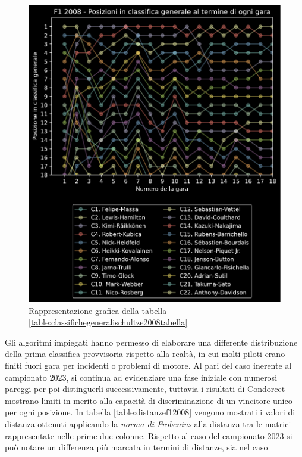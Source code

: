 \documentclass[12pt,a4paper,openright,twoside]{book}
\begin{document}
\begin{figure}[H]
    \centering
     \includegraphics[width=\linewidth]{figures/schultzestandings2008.pdf}
     \caption{Rappresentazione grafica della tabella \ref{table:classifichegeneralischultze2008tabella} }
     \label{fig:classifichegeneralischultze2008figura}
 \end{figure}
 Gli algoritmi impiegati hanno permesso di elaborare una differente distribuzione della prima classifica provvisoria
 rispetto alla realtà, in cui molti piloti erano finiti fuori gara per incidenti o problemi di motore.
 Al pari del caso inerente al campionato 2023, si continua ad evidenziare una fase iniziale 
 con numerosi pareggi per poi distinguerli successivamente, tuttavia i risultati di Condorcet mostrano limiti in merito alla capacità
 di discriminazione di un vincitore unico per ogni posizione.
 In tabella \ref{table:distanzef12008} vengono mostrati i valori di distanza ottenuti applicando la 
 \textit{norma di Frobenius} alla distanza tra le matrici rappresentate nelle prime due colonne.
 Rispetto al caso del campionato 2023 si può notare un differenza più marcata in termini di distanze, sia nel caso
\end{document}
